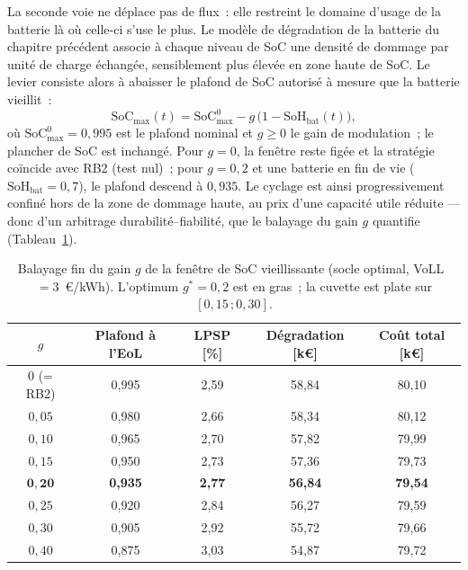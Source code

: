La seconde voie ne déplace pas de flux~: elle restreint le domaine d'usage de la batterie là où celle-ci s'use le plus. Le modèle de dégradation de la batterie du chapitre précédent associe à chaque niveau de SoC une densité de dommage par unité de charge échangée, sensiblement plus élevée en zone haute de SoC. Le levier consiste alors à abaisser le plafond de SoC autorisé à mesure que la batterie vieillit~:
\begin{equation}
\label{eq:soc_ceiling}
\mathrm{SoC}_{\max}(t) = \mathrm{SoC}_{\max}^{0} - g\,\big(1 - \mathrm{SoH}_{\text{bat}}(t)\big),
\end{equation}
où $\mathrm{SoC}_{\max}^{0} = 0{,}995$ est le plafond nominal et $g \geq 0$ le gain de modulation~; le plancher de SoC est inchangé. Pour $g = 0$, la fenêtre reste figée et la stratégie coïncide avec RB2 (test nul)~; pour $g = 0{,}2$ et une batterie en fin de vie ($\mathrm{SoH}_{\text{bat}} = 0{,}7$), le plafond descend à $0{,}935$. Le cyclage est ainsi progressivement confiné hors de la zone de dommage haute, au prix d'une capacité utile réduite — donc d'un arbitrage durabilité--fiabilité, que le balayage du gain $g$ quantifie (Tableau~\ref{tab:socwin_sweep}).

\begin{table}[h!]
\centering
\caption{Balayage fin du gain $g$ de la fenêtre de SoC vieillissante (socle optimal, VoLL~$=3$~€/kWh). L'optimum $g^{*} = 0{,}2$ est en gras~; la cuvette est plate sur $[0{,}15\,; 0{,}30]$.}
\label{tab:socwin_sweep}
\begin{tabular}{ccccc}
\hline
$g$ & Plafond à l'EoL & LPSP [\%] & Dégradation [k€] & Coût total [k€] \\
\hline
$0$ (= RB2) & 0,995 & 2,59 & 58,84 & 80,10 \\
$0{,}05$    & 0,980 & 2,66 & 58,34 & 80,12 \\
$0{,}10$    & 0,965 & 2,70 & 57,82 & 79,99 \\
$0{,}15$    & 0,950 & 2,73 & 57,36 & 79,73 \\
$\mathbf{0{,}20}$ & \textbf{0,935} & \textbf{2,77} & \textbf{56,84} & \textbf{79,54} \\
$0{,}25$    & 0,920 & 2,84 & 56,27 & 79,59 \\
$0{,}30$    & 0,905 & 2,92 & 55,72 & 79,66 \\
$0{,}40$    & 0,875 & 3,03 & 54,87 & 79,72 \\
\hline
\end{tabular}
\end{table}

